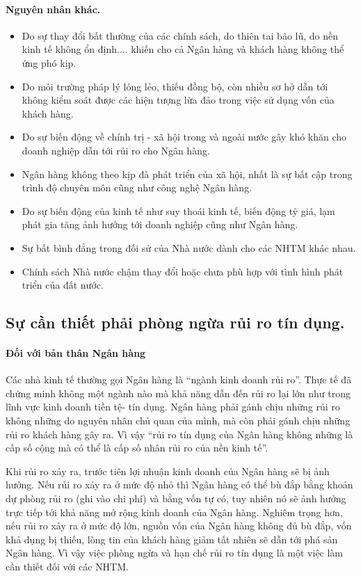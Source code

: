 \paragraph{Nguyên nhân khác.}

\begin{itemize}
\item Do sự thay đổi bất thường của các chính sách, do thiên tai bão lũ, do nền kinh tế không ổn định.... khiến cho cả Ngân hàng và khách hàng không thể ứng phó kịp.
\item Do môi trường pháp lý lỏng lẻo, thiếu đồng bộ, còn nhiều sơ hở dẫn tới không kiểm soát được các hiện tượng lừa đảo trong việc sử dụng vốn của khách hàng.
\item Do sự biến động về chính trị - xã hội trong và ngoài nước gây khó khăn cho doanh nghiệp dẫn tới rủi ro cho Ngân hàng.
\item Ngân hàng không theo kịp đà phát triển của xã hội, nhất là sự bất cập trong trình độ chuyên môn cũng như công nghệ Ngân hàng.
\item Do sự biến động của kinh tế như suy thoái kinh tế, biến động tỷ giá, lạm phát gia tăng ảnh hưởng tới doanh nghiệp cũng như Ngân hàng.
\item Sự bất bình đẳng trong đối sử của Nhà nước dành cho các NHTM khác nhau.
\item Chính sách Nhà nước chậm thay đổi hoặc chưa phù hợp với tình hình phát triển của đất nước.
\end{itemize}

\subsection{Sự cần thiết phải phòng ngừa rủi ro tín dụng.}

\paragraph{Đối với bản thân Ngân hàng}
Các nhà kinh tế thường gọi Ngân hàng là “ngành kinh doanh rủi ro”. Thực tế đã chứng minh không một ngành nào mà khả năng dẫn đến rủi ro lại lớn như trong lĩnh vực kinh doanh tiền tệ- tín dụng. Ngân hàng phải gánh chịu những rủi ro không những do nguyên nhân chủ quan của mình, mà còn phải gánh chịu những rủi ro khách hàng gây ra. Vì vậy “rủi ro tín dụng của Ngân hàng không những là cấp số cộng mà có thể là cấp số nhân rủi ro của nền kinh tế”.

Khi rủi ro xảy ra, trước tiên lợi nhuận kinh doanh của Ngân hàng sẽ bị ảnh hưởng. Nếu rủi ro xảy ra ở mức độ nhỏ thì Ngân hàng có thể bù đắp bằng khoản dự phòng rủi ro (ghi vào chi phí) và bằng vốn tự có, tuy nhiên nó sẽ ảnh hưởng trực tiếp tới khả năng mở rộng kinh doanh của Ngân hàng. Nghiêm trọng hơn, nếu rủi ro xảy ra ở mức độ lớn, nguồn vốn của Ngân hàng không đủ bù đắp, vốn khả dụng bị thiếu, lòng tin của khách hàng giảm tất nhiên sẽ dẫn tới phá sản Ngân hàng. Vì vậy việc phòng ngừa và hạn chế rủi ro tín dụng là một việc làm cần thiết đối với các NHTM.


